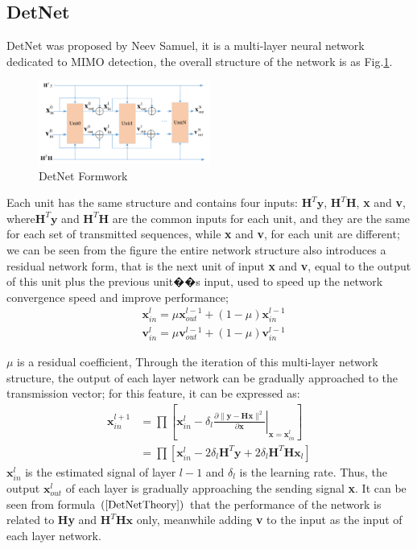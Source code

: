 \documentclass[conference]{IEEEtran}
\begin{document}
\subsection{DetNet}
DetNet was proposed by Neev Samuel, it is a multi-layer neural network dedicated to MIMO detection, the overall structure of the network is as Fig.\ref{Network model}.
\begin{figure}[ht]
  \centering
  \includegraphics[width=0.5\textwidth]{DetNetFormWork.pdf}
  \caption{DetNet Formwork}
  \label{Network model}
\end{figure}
Each unit has the same structure and contains four inputs: ${\textbf{H}^T\textbf{y}}$, ${\textbf{H}^T\textbf{H}}$, \textbf{x} and \textbf{v}, where${\textbf{H}^T\textbf{y}}$ and ${\textbf{H}^T\textbf{H}}$ are the common inputs for each unit, and they are the same for each set of transmitted sequences, while \textbf{x} and \textbf{v}, for each unit are different; we can be seen from the figure the entire network structure also introduces a residual network form, that is the next unit of input \textbf{x} and \textbf{v}, equal to the output of this unit plus the previous unit��s input, used to speed up the network convergence speed and improve performance;
\begin{equation}
\label{ResNet}
\begin{split}
&{\textbf{x}_{in}^l}=\mu{\textbf{x}_{out}^{l-1}}+(1-\mu)\textbf{x}_{in}^{l-1}\\
&{\textbf{v}_{in}^l}=\mu{\textbf{v}_{out}^{l-1}}+(1-\mu)\textbf{v}_{in}^{l-1}
\end{split}
\end{equation}


$\mu$  is a residual coefficient, Through the iteration of this multi-layer network structure, the output of each layer network can be gradually approached to the transmission vector; for this feature, it can be expressed as:
\begin{equation}
\label{DetNetTheory}
\begin{split}
\textbf{x}_{in}^{l+1} &=\prod\left[\textbf{x}_{in}^{l}-\delta_l\left.\frac{\partial\|\textbf{y}-\textbf{Hx}\|^2}{\partial\textbf{x}}\right|_{\textbf{x}=\textbf{x}_{in}^l}\right]\\
&=\prod\left[\textbf{x}_{in}^l-2\delta_l\textbf{H}^T\textbf{y}+2\delta_l\textbf{H}^T\textbf{Hx}_l\right]
\end{split}
\end{equation}
${\textbf{x}_{in}^l}$ is the estimated signal of layer $l-1$ and $\delta_l$ is the learning rate. Thus, the output ${\textbf{x}_{out}^l}$ of each layer is gradually approaching the sending signal \textbf{x}.
It can be seen from formula $\left(\ref{DetNetTheory}\right)$ that the performance of the network is related to \textbf{Hy} and ${\textbf{H}^T\textbf{Hx}}$ only, meanwhile adding \textbf{v} to the input as the input of each layer network.
\end{document}
